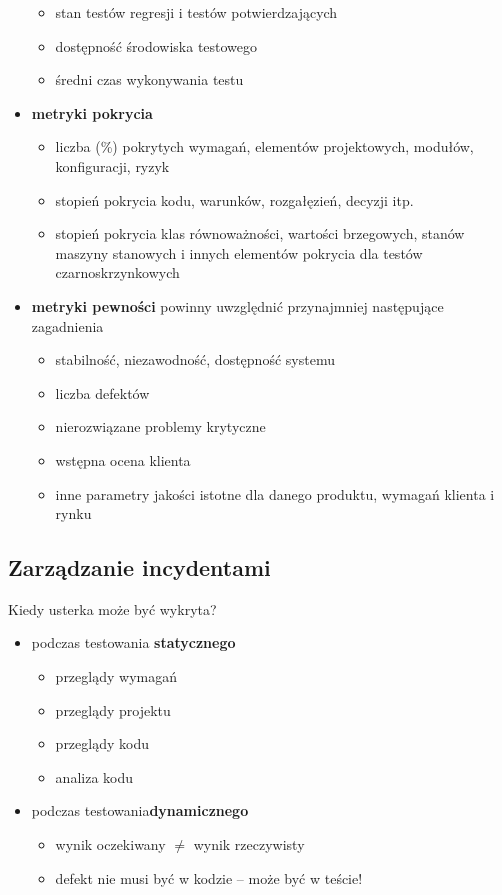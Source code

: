\documentclass[../main.tex]{subfiles}
\begin{document}
\begin{itemize}
\begin{itemize}
            \item stan testów regresji i testów potwierdzających
            \item dostępność środowiska testowego
            \item średni czas wykonywania testu
        \end{itemize}
        \item \textbf{metryki pokrycia}
        \begin{itemize}
            \item liczba (\%) pokrytych wymagań, elementów projektowych, modułów, konfiguracji, ryzyk
            \item stopień pokrycia kodu, warunków, rozgałęzień, decyzji itp.
            \item stopień pokrycia klas równoważności, wartości brzegowych, stanów maszyny stanowych i innych elementów pokrycia dla testów czarnoskrzynkowych
        \end{itemize}
        \item \textbf{metryki pewności} powinny uwzględnić przynajmniej następujące zagadnienia
        \begin{itemize}
            \item stabilność, niezawodność, dostępność systemu
            \item liczba defektów
            \item nierozwiązane problemy krytyczne
            \item wstępna ocena klienta
            \item inne parametry jakości istotne dla danego produktu, wymagań klienta i rynku
        \end{itemize}
    \end{itemize}

    \subsection{Zarządzanie incydentami}
    Kiedy usterka może być wykryta?
    \begin{itemize}
        \item podczas testowania \textbf{statycznego}
        \begin{itemize}
            \item przeglądy wymagań
            \item przeglądy projektu
            \item przeglądy kodu
            \item analiza kodu
        \end{itemize}
        \item podczas testowania\textbf{dynamicznego}
        \begin{itemize}
            \item wynik oczekiwany $\neq$ wynik rzeczywisty
            \item defekt nie musi być w kodzie – może być w teście!
        \end{itemize}
    \end{itemize}
\end{document}
